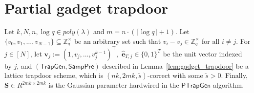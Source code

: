 \section{Partial gadget trapdoor}
\label{ap:4}
Let $k,N,n,\log q \in poly(\lambda)$ and
$m = n \cdot (\lceil \log q \rceil + 1)$.
Let $\{v_0,v_1,\ldots,v_{N-1}\}\subseteq \mathbb{Z}_q^{\times}$
be an arbitrary set such that
$v_i - v_j \in \mathbb{Z}_q^{\times}$ for all $i\neq j$.
For $j\in[N]$, let
$
    \mathbf{v}_j := (1,v_j,\ldots,v_j^{k-1})^{\top},
$
$\widehat{\mathbf{e}}_{T,j}\in\{0,1\}^{T}$ be the unit vector indexed by $j$,
and $(\mathsf{TrapGen},\mathsf{SampPre})$ described in Lemma~\ref{lem:gadget_trapdoor} be a lattice trapdoor scheme,
which is $(nk,2mk,\widetilde{s})$-correct with some $\widetilde{s}>0$.
Finally, $\mathbf{S}\in R^{2mk\times 2mk}$ is the Gaussian parameter
hardwired in the $\mathsf{PTrapGen}$ algorithm.

